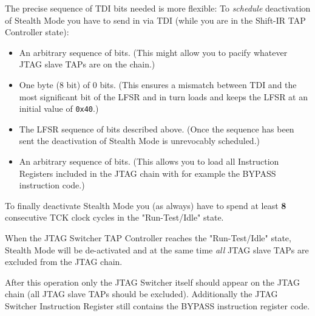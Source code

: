 \documentclass[10pt,english,a4paper]{report}
\begin{document}
The precise sequence of TDI bits needed is more flexible: To {\em schedule} deactivation of Stealth Mode you
have to send in via TDI (while you are in the Shift-IR TAP Controller state):
\begin{itemize}
\item An arbitrary sequence of bits. (This might allow you to pacify whatever JTAG slave TAPs are on the chain.)
\item One byte (8 bit) of 0 bits. (This ensures a mismatch between TDI and the most significant bit of
the LFSR and in turn loads and keeps the LFSR at an initial value of {\tt 0x40}.)
\item The LFSR sequence of bits described above. (Once the sequence has been sent the deactivation of Stealth Mode is unrevocably scheduled.)
\item An arbitrary sequence of bits. (This allows you to load all Instruction Registers included in the JTAG chain with for example
the BYPASS instruction code.)
\end{itemize}

To finally deactivate Stealth Mode you (as always) have to spend
at least {\bf 8} consecutive TCK clock cycles in the "Run-Test/Idle"
state.

When the JTAG Switcher TAP Controller reaches the "Run-Test/Idle" state, Stealth Mode will be de-activated and at the
same time {\em all} JTAG slave TAPs are excluded from the JTAG chain.

After this operation only the JTAG Switcher itself should appear on the JTAG chain (all JTAG slave TAPs should be excluded).
Additionally the JTAG Switcher Instruction Register still contains the BYPASS instruction register code.

\end{document}
